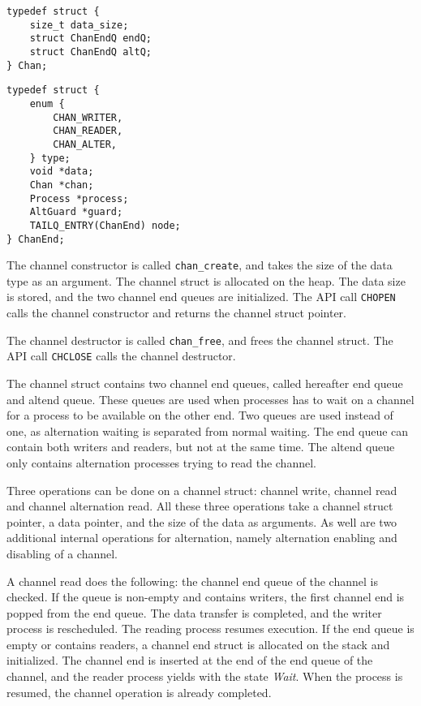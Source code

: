 \noindent\begin{minipage}{.45\textwidth}
\begin{lstlisting}[caption={Channel type struct},style={CustomC},label={lst:channel_type_struct}]
typedef struct {
    size_t data_size;
    struct ChanEndQ endQ;
    struct ChanEndQ altQ;
} Chan;
\end{lstlisting}
\end{minipage}\hfill
\begin{minipage}{.45\textwidth}
\begin{lstlisting}[caption={Channel end type struct},style={CustomC},label={lst:channel_end_type_struct}]
typedef struct {
    enum {
        CHAN_WRITER,
        CHAN_READER,
        CHAN_ALTER,
    } type;
    void *data;
    Chan *chan;
    Process *process;
    AltGuard *guard;
    TAILQ_ENTRY(ChanEnd) node;
} ChanEnd;
\end{lstlisting}
\end{minipage}

The channel constructor is called \texttt{chan\_create}, and takes the size of the data type as an argument. The channel struct is allocated on the heap. The data size is stored, and the two channel end queues are initialized. The API call \texttt{CHOPEN} calls the channel constructor and returns the channel struct pointer. 

The channel destructor is called \texttt{chan\_free}, and frees the channel struct. The API call \texttt{CHCLOSE} calls the channel destructor.

The channel struct contains two channel end queues, called hereafter end queue and altend queue. These queues are used when processes has to wait on a channel for a process to be available on the other end. Two queues are used instead of one, as alternation waiting is separated from normal waiting. The end queue can contain both writers and readers, but not at the same time. The altend queue only contains alternation processes trying to read the channel. 

Three operations can be done on a channel struct: channel write, channel read and channel alternation read. All these three operations take a channel struct pointer, a data pointer, and the size of the data as arguments. As well are two additional internal operations for alternation, namely alternation enabling and disabling of a channel. 

A channel read does the following: the channel end queue of the channel is checked. If the queue is non\hyp{}empty and contains writers, the first channel end is popped from the end queue. The data transfer is completed, and the writer process is rescheduled. The reading process resumes execution. If the end queue is empty or contains readers, a channel end struct is allocated on the stack and initialized. The channel end is inserted at the end of the end queue of the channel, and the reader process yields with the state \textit{Wait}. When the process is resumed, the channel operation is already completed.

